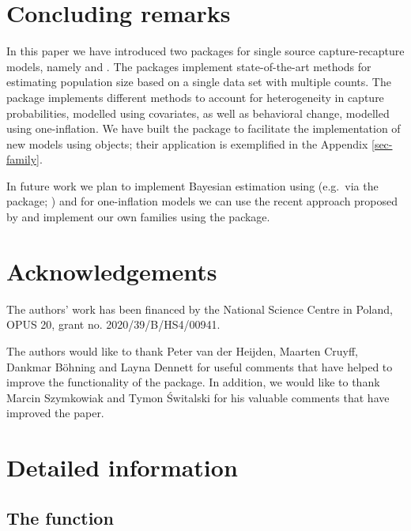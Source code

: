 \documentclass[nojss]{jss}
\newcommand{\1}{\mathcal{I}} \newcommand{\bZero}{\boldsymbol{0}}
\begin{document}
\section{Concluding remarks}\label{concluding-remarks}

In this paper we have introduced two packages for single source
capture-recapture models, namely  and
. The packages implement state-of-the-art
methods for estimating population size based on a single data set with
multiple counts. The package implements different methods to account for
heterogeneity in capture probabilities, modelled using covariates, as
well as behavioral change, modelled using one-inflation. We have built
the package to facilitate the implementation of new models using
 objects; their application is exemplified in the Appendix
\ref{sec-family}.

In future work we plan to implement Bayesian estimation using
 (e.g.~via the  package;
\cite{carpenter2017stan, brms}) and for one-inflation models we can use
the recent approach proposed by \cite{tuoto2022bayesian} and implement
our own families using the  package.

\section{Acknowledgements}\label{Acknowledgements}

The authors' work has been financed by the National Science Centre in
Poland, OPUS 20, grant no. 2020/39/B/HS4/00941.

The authors would like to thank Peter van der Heijden, Maarten Cruyff,
Dankmar Böhning and Layna Dennett for useful comments that have helped
to improve the functionality of the package. In addition, we would like
to thank Marcin Szymkowiak and Tymon Świtalski for his valuable comments
that have improved the paper.

\appendix

\section{Detailed information}\label{sec-details}

\subsection[The estimatePopsizeFit function]{The
 function}\label{sec-estimatePopsizeFit}
\end{document}
